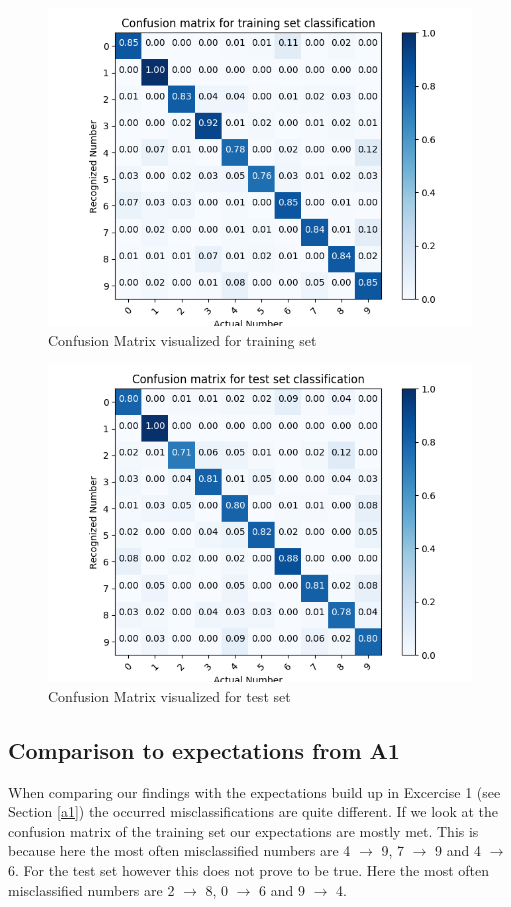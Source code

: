 \documentclass{article}
\begin{document}
\begin{figure}[H]
\centering
\includegraphics[width=0.9\linewidth]{img/cftrain.png}
\caption{Confusion Matrix visualized for training set}
\label{fig:cftrain}
\end{figure}
\begin{figure}[H]
\centering
\includegraphics[width=0.9\linewidth]{img/cftest.png}
\caption{Confusion Matrix visualized for test set}
\label{fig:cftest}
\end{figure}

\subsection{Comparison to expectations from A1}
When comparing our findings with the expectations build up in Excercise 1 (see Section \ref{a1}) the occurred misclassifications are quite different.
If we look at the confusion matrix of the training set our expectations are mostly met. This is because here the  most often misclassified numbers are 4 $\rightarrow$ 9, 7 $\rightarrow$ 9 and 4 $\rightarrow$ 6.
For the test set however this does not prove to be true. Here the most often misclassified numbers are 2 $\rightarrow$ 8, 0 $\rightarrow$ 6 and 9 $\rightarrow$ 4.
\end{document}
